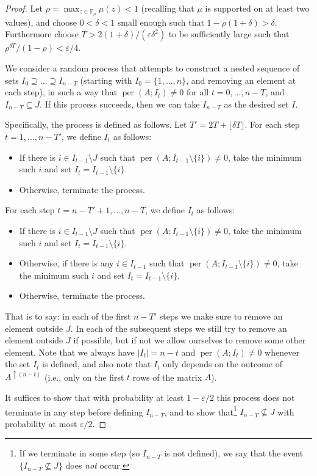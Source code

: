\documentclass[10pt,reqno]{amsart}
\numberwithin{equation}{section}
\theoremstyle{remark}
\newcommand{\mb}{\mathbb}
\newcommand{\on}{\operatorname}
\newcommand{\eps}{\varepsilon}
\begin{document}
\begin{proof} Let $\rho=\max_{z\in\mb F_{p}}\mu(z)<1$ (recalling that $\mu$
is supported on at least two values), and choose $0<\delta<1$
small enough such that $1-\rho(1+\delta)>\delta$. Furthermore choose $T>2(1+\delta)/(\eps\delta^2)$ to be sufficiently large such that $\rho^{\delta T}/(1-\rho)<\eps/4$.

We consider a random process that attempts to construct a nested sequence
of sets $I_{0}\supseteq\dots\supseteq I_{n-T}$ (starting with $I_{0}=\{1,\dots,n\}$,
and removing an element at each step), in such a way that $\on{per}(A;I_{t})\ne0$
for all $t=0,\dots,n-T$, and $I_{n-T}\subseteq J$. If this process succeeds,
then we can take $I_{n-T}$ as the desired set $I$.

Specifically, the process is defined as follows. Let $T'=2T+\lfloor \delta T\rfloor$. For each step $t=1,\dots,n-T'$, we define $I_t$ as follows:
\begin{itemize}
\item If there is $i\in I_{t-1}\setminus J$ such that $\on{per}(A;I_{t-1}\setminus\{i\})\ne0$, take the minimum such $i$ and
set $I_{t}=I_{t-1}\setminus\{i\}$.
\item Otherwise, terminate the process.
\end{itemize}
For each step $t=n-T'+1,\dots, n-T$, we define $I_t$ as follows:
\begin{itemize}
\item If there is $i\in I_{t-1}\setminus J$ such that $\on{per}(A;I_{t-1}\setminus\{i\})\ne0$, take the minimum such $i$ and
set $I_{t}=I_{t-1}\setminus\{i\}$.
\item Otherwise, if there is any $i\in I_{t-1}$ such that $\on{per}(A;I_{t-1}\setminus\{i\})\ne0$, take the minimum such $i$ and
set $I_{t}=I_{t-1}\setminus\{i\}$.
\item Otherwise, terminate the process.
\end{itemize}
That is to say: in each of the first $n-T'$ steps we make sure to
remove an element outside $J$. In each of the subsequent
steps we still try to remove an element outside $J$ if possible,
but if not we allow ourselves to remove some other element. Note that we always have $|I_t|=n-t$ and $\on{per}(A;I_{t})\ne0$ whenever the set $I_t$ is defined, and also note that $I_t$ only depends on the outcome of $A^{\uparrow (n-t)}$ (i.e., only on the first $t$ rows of the matrix $A$).

It suffices to show that with probability at least $1-\varepsilon/2$
this process does not terminate in any step before defining $I_{n-T}$, and to show
that\footnote{If we terminate in some step (so $I_{n-T}$ is not defined), we say that the event $\{I_{n-T}\not \subseteq J\}$ does \emph{not} occur.} $I_{n-T}\nsubseteq J$ with probability at most $\varepsilon/2$.


\end{proof}
\end{document}
